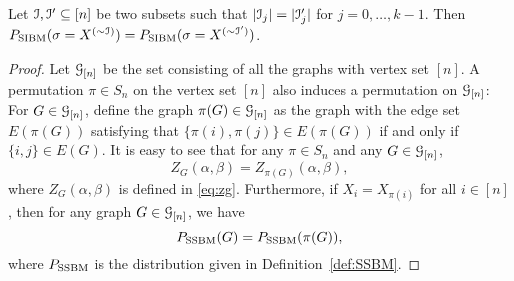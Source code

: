 \documentclass{article}
\begin{document}
\begin{lemma} \label{lm:cc}
	Let $\mathcal{I},\mathcal{I}'\subseteq[n]$ be two subsets such that $|\mathcal{I}_j|=|\mathcal{I}_j'|$ for $j=0,\dots,k-1$. 
	Then $P_{\operatorname{SIBM}}(\sigma=X^{(\sim\mathcal{I})}) = P_{\operatorname{SIBM}}(\sigma=X^{(\sim\mathcal{I}')})$.
\end{lemma}
\begin{proof}
Let $\mathcal{G}_{[n]}$ be the set consisting of all the graphs with vertex set $[n]$.
A permutation $\pi\in S_n$ on the vertex set $[n]$ also induces a permutation on $\mathcal{G}_{[n]}$: For $G\in\mathcal{G}_{[n]}$, define the graph $\pi(G)\in\mathcal{G}_{[n]}$ as the graph with the edge set $E(\pi(G))$ satisfying that $\{\pi(i),\pi(j)\}\in E(\pi(G))$ if and only if $\{i,j\}\in E(G)$.
It is easy to see that for any $\pi\in S_n$ and any $G\in\mathcal{G}_{[n]}$,
$$
Z_G(\alpha,\beta)
=Z_{\pi(G)}(\alpha,\beta),
$$
where $Z_G(\alpha,\beta)$ is defined in \eqref{eq:zg}.
Furthermore, 
if $X_i=X_{\pi(i)}$ for all $i\in[n]$, then for any graph $G\in\mathcal{G}_{[n]}$, we have
$$
P_{\operatorname{SSBM}}(G)=P_{\operatorname{SSBM}}(\pi(G))  ,
$$
where $P_{\operatorname{SSBM}}$ is the distribution given in Definition~\ref{def:SSBM}.


\end{proof}
\end{document}
